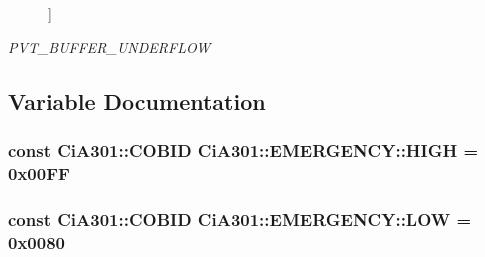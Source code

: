 \begin{Desc}
\begin{description}
{}]\item[{\em 
\hypertarget{namespace_ci_a301_1_1_e_m_e_r_g_e_n_c_y_a5b4233d92eee286424fe45b52afacc07a1ece25e44a861df72fe9ea22e1b1e0a3}{P\-V\-T\-\_\-\-B\-U\-F\-F\-E\-R\-\_\-\-U\-N\-D\-E\-R\-F\-L\-O\-W}\label{namespace_ci_a301_1_1_e_m_e_r_g_e_n_c_y_a5b4233d92eee286424fe45b52afacc07a1ece25e44a861df72fe9ea22e1b1e0a3}
}]\end{description}
\end{Desc}


\subsection{Variable Documentation}
\hypertarget{namespace_ci_a301_1_1_e_m_e_r_g_e_n_c_y_a86da6584e2722e7e1b2c0fc763c06754}{
\subsubsection[{H\-I\-G\-H}]{\setlength{\rightskip}{0pt plus 5cm}const {\bf Ci\-A301\-::\-C\-O\-B\-I\-D} Ci\-A301\-::\-E\-M\-E\-R\-G\-E\-N\-C\-Y\-::\-H\-I\-G\-H = 0x00\-F\-F}}\label{namespace_ci_a301_1_1_e_m_e_r_g_e_n_c_y_a86da6584e2722e7e1b2c0fc763c06754}
\hypertarget{namespace_ci_a301_1_1_e_m_e_r_g_e_n_c_y_afd634e483d0eedb29789234d50cb6895}{
\subsubsection[{L\-O\-W}]{\setlength{\rightskip}{0pt plus 5cm}const {\bf Ci\-A301\-::\-C\-O\-B\-I\-D} Ci\-A301\-::\-E\-M\-E\-R\-G\-E\-N\-C\-Y\-::\-L\-O\-W = 0x0080}}\label{namespace_ci_a301_1_1_e_m_e_r_g_e_n_c_y_afd634e483d0eedb29789234d50cb6895}
